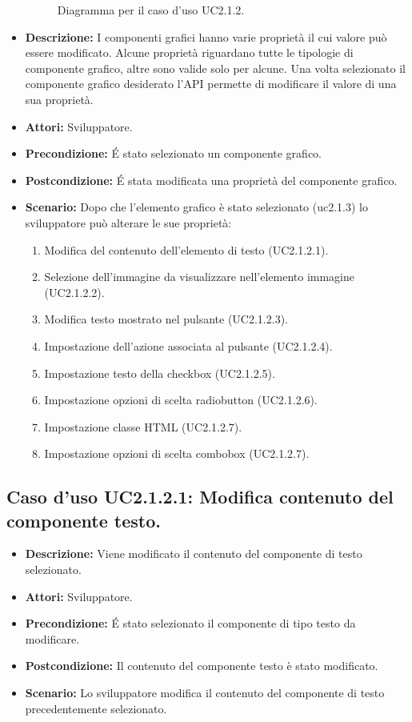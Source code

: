 \begin{itemize}
\begin{figure}[ht]
   \caption{Diagramma per il caso d'uso UC2.1.2.}
\end{figure}
\FloatBarrier
\item[]\textbf{Descrizione:} I componenti grafici hanno varie proprietà il cui valore può essere modificato. Alcune proprietà riguardano tutte le tipologie di componente grafico, altre sono valide solo per alcune. Una volta selezionato il componente grafico desiderato l'API permette di modificare il valore di una sua proprietà.
\item[]\textbf{Attori:} Sviluppatore. 
\item[]\textbf{Precondizione:} \'E stato selezionato un componente grafico. 
\item[]\textbf{Postcondizione:} \'E stata modificata una proprietà del componente grafico. 
\item[]\textbf{Scenario:}
 Dopo che l'elemento grafico è stato selezionato (uc2.1.3) lo sviluppatore può alterare le sue proprietà:

\begin{enumerate}
\item Modifica del contenuto dell'elemento di testo (UC2.1.2.1).
\item Selezione dell'immagine da visualizzare nell'elemento immagine (UC2.1.2.2).
\item Modifica testo mostrato nel pulsante (UC2.1.2.3).
\item Impostazione dell'azione associata al pulsante (UC2.1.2.4).
\item Impostazione testo della checkbox (UC2.1.2.5).
\item Impostazione opzioni di scelta radiobutton (UC2.1.2.6).
\item Impostazione classe HTML (UC2.1.2.7).
\item Impostazione opzioni di scelta combobox (UC2.1.2.7).
\end{enumerate} 
\end{itemize}

\subsection{Caso d'uso UC2.1.2.1: Modifica contenuto del componente testo.}
\begin{itemize}
\item[]\textbf{Descrizione:} Viene modificato il contenuto del componente di testo selezionato.
\item[]\textbf{Attori:} Sviluppatore. 
\item[]\textbf{Precondizione:} \'E stato selezionato il componente di tipo testo da modificare. 
\item[]\textbf{Postcondizione:} Il contenuto del componente testo è stato modificato. 
\item[]\textbf{Scenario:}
 Lo sviluppatore modifica il contenuto del componente di testo precedentemente selezionato. 
\end{itemize}


